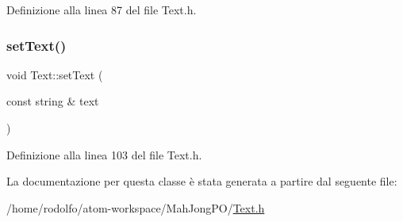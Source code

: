 Definizione alla linea 87 del file Text.\+h.

\mbox{\label{class_text_af0fcddcb8354f753947c371d634fabf9}} 
\subsubsection{\texorpdfstring{set\+Text()}{setText()}}
{\footnotesize\ttfamily void Text\+::set\+Text (\begin{DoxyParamCaption}\item[{const string \&}]{text }\end{DoxyParamCaption})\hspace{0.3cm}{\ttfamily [inline]}}



Definizione alla linea 103 del file Text.\+h.



La documentazione per questa classe è stata generata a partire dal seguente file\+:\begin{DoxyCompactItemize}
\item 
/home/rodolfo/atom-\/workspace/\+Mah\+Jong\+P\+O/\hyperlink{_text_8h}{Text.\+h}\end{DoxyCompactItemize}
